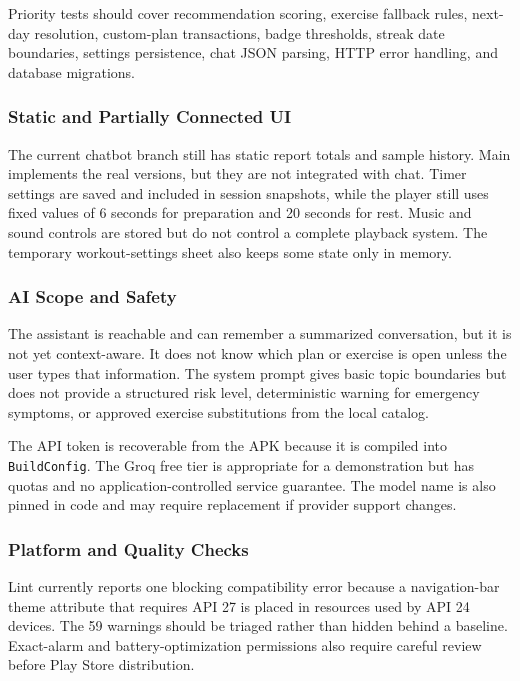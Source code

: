 Priority tests should cover recommendation scoring, exercise fallback rules, next-day resolution, custom-plan transactions, badge thresholds, streak date boundaries, settings persistence, chat JSON parsing, HTTP error handling, and database migrations.

\subsubsection{Static and Partially Connected UI}

The current chatbot branch still has static report totals and sample history. Main implements the real versions, but they are not integrated with chat. Timer settings are saved and included in session snapshots, while the player still uses fixed values of 6 seconds for preparation and 20 seconds for rest. Music and sound controls are stored but do not control a complete playback system. The temporary workout-settings sheet also keeps some state only in memory.

\subsubsection{AI Scope and Safety}

The assistant is reachable and can remember a summarized conversation, but it is not yet context-aware. It does not know which plan or exercise is open unless the user types that information. The system prompt gives basic topic boundaries but does not provide a structured risk level, deterministic warning for emergency symptoms, or approved exercise substitutions from the local catalog.

The API token is recoverable from the APK because it is compiled into \texttt{BuildConfig}. The Groq free tier is appropriate for a demonstration but has quotas and no application-controlled service guarantee. The model name is also pinned in code and may require replacement if provider support changes.

\subsubsection{Platform and Quality Checks}

Lint currently reports one blocking compatibility error because a navigation-bar theme attribute that requires API 27 is placed in resources used by API 24 devices. The 59 warnings should be triaged rather than hidden behind a baseline. Exact-alarm and battery-optimization permissions also require careful review before Play Store distribution.

